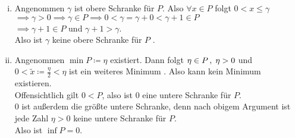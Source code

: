 \documentclass[../ana1.tex]{subfiles}
\begin{document}
\begin{bew}\leavevmode
	\begin{enumerate}[(i)]
		\item Angenommen \(\gamma\) ist obere Schranke für \(P\). Also \(\forall x \in P\) folgt \( 0 < x \leq \gamma\)\\
			  \(\implies \gamma > 0 \implies \gamma \in P \implies 0 < \gamma = \gamma + 0 < \gamma + 1 \in P\)\\
			  \(\implies \gamma + 1 \in P\) und \(\gamma + 1 > \gamma\).\\
			  Also ist \(\gamma\) keine obere Schranke für \(P\) \Lightning.
		\item Angenommen \(\min P \coloneqq \eta\) existiert. Dann folgt \( \eta \in P \operatorname{,} \; \eta > 0\) und
		      \(0 < \tilde{x} \coloneqq \frac{\eta}{2} < \eta\) ist ein weiteres Minimum \Lightning. Also kann kein Minimum existieren.\\
			  Offensichtlich gilt \(0 < P\), also ist \(0\) eine untere Schranke für \(P\).\\
			  \(0\) ist außerdem die größte untere Schranke, denn nach obigem Argument ist jede Zahl \(\eta > 0\) keine untere Schranke für \(P\).\\
			  Also ist \(\inf P = 0\). \qedhere
	\end{enumerate}
\end{bew}
\end{document}
